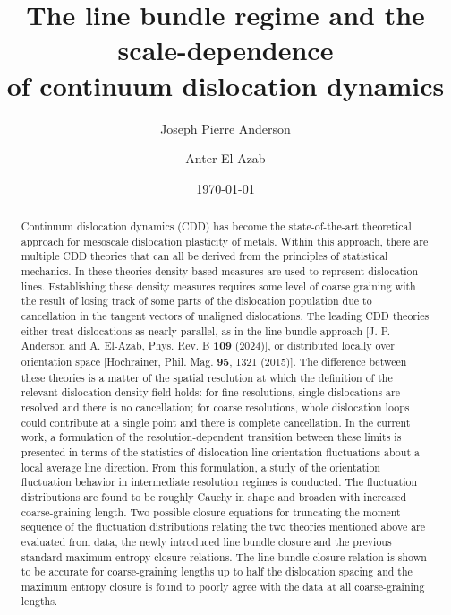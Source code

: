 \documentclass[reprint,amsmath,amssymb,aps,prb,nofootinbib,longbibliography]{revtex4-2}
\begin{document}

\title{The line bundle regime and the scale-dependence \\of continuum dislocation dynamics}

\author{Joseph Pierre Anderson}
\author{Anter El-Azab}
%

\date{\today}

\begin{abstract}

Continuum dislocation dynamics (CDD) has become the state-of-the-art theoretical approach for mesoscale dislocation plasticity of metals. Within this approach, there are multiple CDD theories that can all be derived from the principles of statistical mechanics. In these theories density-based measures are used to represent dislocation lines. Establishing these density measures requires some level of coarse graining with the result of losing track of some parts of the dislocation population due to cancellation in the tangent vectors of unaligned dislocations. The leading CDD theories either treat dislocations as nearly parallel, as in the line bundle approach [J. P. Anderson and A. El-Azab, Phys. Rev. B \textbf{109} (2024)], or distributed locally over orientation space [Hochrainer, Phil. Mag. \textbf{95}, 1321 (2015)]. The difference between these theories is a matter of the spatial resolution at which the definition of the relevant dislocation density field holds: for fine resolutions, single dislocations are resolved and there is no cancellation; for coarse resolutions, whole dislocation loops could contribute at a single point and there is complete cancellation. In the current work, a formulation of the resolution-dependent transition between these limits is presented in terms of the statistics of dislocation line orientation fluctuations about a local average line direction. From this formulation, a study of the orientation fluctuation behavior in intermediate resolution regimes is conducted. The fluctuation distributions are found to be roughly Cauchy in shape and broaden with increased coarse-graining length. Two possible closure equations for truncating the moment sequence of the fluctuation distributions relating the two theories mentioned above are evaluated from data, the newly introduced line bundle closure and the previous standard maximum entropy closure relations. The line bundle closure relation is shown to be accurate for coarse-graining lengths up to half the dislocation spacing and the maximum entropy closure is found to poorly agree with the data at all coarse-graining lengths.

\end{abstract}
\end{document}
